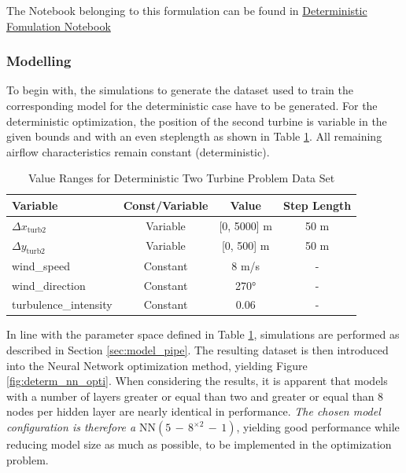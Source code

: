 The Notebook belonging to this formulation can be found in \href{https://github.com/schmeti/uc3m_TFM_wind_farm_optimization_codebase/blob/main/Windfarm_power_modelling/0_two_turbine_problem_constrLearn_determin.ipynb}{Deterministic Fomulation Notebook} \cite{schmetz2025twoturbine_determ}

\subsubsection{Modelling}

To begin with, the simulations to generate the dataset used to train the corresponding model for the deterministic case have to be generated. For the deterministic optimization, the position of the second turbine is variable in the given bounds and with an even steplength  as shown in Table \ref{tab:val_determ_data}. All remaining airflow characteristics remain constant (deterministic).

\begin{table}[ht]
	\centering
	\caption{Value Ranges for Deterministic Two Turbine Problem Data Set}
	\begin{tabular}{|l|c|c|c|}
		\hline
		\textbf{Variable} & \textbf{Const/Variable} & \textbf{Value} & Step Length\\
		\hline
		$\Delta x_{\text{turb2}}$ & Variable & [0, 5000] m & 50 m\\
		$\Delta y_{\text{turb2}}$ & Variable & [0, 500] m & 50 m \\
		wind\_speed & Constant & 8 m/s & -\\
		wind\_direction & Constant & 270°&- \\
		turbulence\_intensity & Constant & 0.06 & - \\
		\hline
	\end{tabular}

	\label{tab:val_determ_data}
\end{table}

In line with the parameter space defined in Table \ref{tab:val_determ_data}, simulations are performed as described in Section \ref{sec:model_pipe}. The resulting dataset is then introduced into the Neural Network optimization method, yielding Figure \ref{fig:determ_nn_opti}. When considering the results, it is apparent that models with a number of layers greater or equal than two and greater or equal than 8 nodes per hidden layer are nearly identical in performance. \textit{The chosen model configuration is therefore a $\text{NN}(5\,{-}\,8^{\times2}\,{-}\,1)$}, yielding good performance while reducing model size as much as possible, to be implemented in the optimization problem. 

